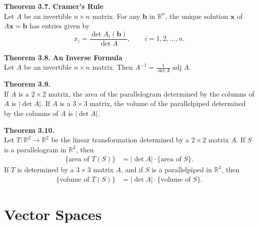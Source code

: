 \documentclass[10pt]{book}
\newenvironment{boxthm}{\begin{mdframed}[backgroundcolor=gray!30,nobreak=true]}{\end{mdframed}}
\newcommand{\R}{\mathbb{R}}
\newcommand{\vect}[1]{\ensuremath{\boldsymbol{\mathbf{#1}}}}
\DeclareMathOperator{\adj}{adj}
\newcommand{\Axb}{A\vect{x}=\vect{b}}
\newcommand{\Tmap}[2]{T:\R^{#1}\to\R^{#2}}
\begin{document}
\begin{boxthm}
	\textbf{Theorem 3.7.}
	\textbf{Cramer's Rule} \\
	Let $A$ be an invertible $n\times n$ matrix. For any $\vect{b}$ in $\R^n$, the unique solution $\vect{x}$ of $\Axb$ has entries given by
	$$ x_i = \frac{\det A_i(\vect{b})}{\det A},  \qquad  i = 1,2,\ldots, n. $$
\end{boxthm}
\begin{boxthm}
	\textbf{Theorem 3.8.}
	\textbf{An Inverse Formula} \\
	Let $A$ be an invertible $n\times n$ matrix. Then $ A^{-1} = \frac{1}{\det A}\adj A. $
\end{boxthm}
\begin{boxthm}
	\textbf{Theorem 3.9.} \\
	If $A$ is a $2\times 2$ matrix, the area of the parallelogram determined by the columns of $A$ is $|\det A|$. If $A$ is a $3\times 3$ matrix, the volume of the parallelpiped determined by the columns of $A$ is $|\det A|$.
\end{boxthm}
\begin{boxthm}
	\textbf{Theorem 3.10.} \\
	Let $\Tmap{2}{2}$ be the linear transformation determined by a $2\times 2$ matrix $A$. If $S$ is a parallelogram in $\R^2$, then
	\begin{align*}
	\{\text{area of } T(S)\} &= |\det A|\cdot\{\text{area of } S\}.
	\end{align*}
	If $T$ is determined by a $3\times 3$ matrix $A$, and if $S$ is a parallelpiped in $\R^3$, then
	\begin{align*}
	\{\text{volume of } T(S)\} &= |\det A|\cdot\{\text{volume of } S\}.
	\end{align*}
\end{boxthm}
\vfill


\newpage


\chapter{Vector Spaces}
\end{document}
